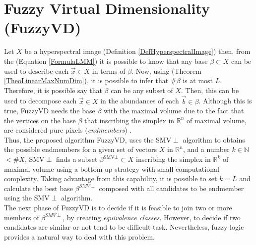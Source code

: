 \documentclass[11pt, oneside]{Thesis} %
\begin{document}
\section{Fuzzy Virtual Dimensionality (FuzzyVD)}

\label{subsectionFuzzyVDDescription}

Let $X$ be a hyperspectral image (Definition \ref{DefHyperspectralImage}) then, 
from the (Equation \ref{FormulaLMM}) it is possible to know that 
any base $\beta \subset X$ can be used to describe each $\vec{x} \in X$ in terms of 
$\beta$. Now, using (Theorem \ref{TheoLinearMaxNumDim}), it is possible to 
infer that $\# \beta$ is at most $L$. Therefore, it is possible say that 
$\beta$ can be any subset of $X$. Then, this can be used to decompose each $\vec{x} \in X$ 
in the abundances of each $\vec{b} \in \beta$. Although this is true, FuzzyVD needs the 
base $\beta$ with the maximal volume due to the fact that the vertices on the base $\beta$ 
that inscribing the simplex in $\mathbb{R}^{n}$ of maximal volume, are considered pure 
pixels (\emph{endmembers}) \cite{NFINDR}.\\

Thus, the proposed algorithm FuzzyVD, uses the SMV$\perp$ algorithm to obtains the possible endmembers for 
a given set of vectors $X$ in $\mathbb{R}^{n}$, and a number $k \in \mathbb{N}$ $ < \#X$, 
SMV$\perp$ finds a subset $\beta^{\text{SMV}\perp} \subset X$ inscribing the simplex in 
$\mathbb{R}^{k}$ of maximal volume using a bottom-up strategy with small computational 
complexity. Taking advantage from this capability, it is possible to set $k = L$ and 
calculate the best base $\beta^{SMV\perp}$ composed with all candidates to be endmember 
using the SMV$\perp$ algorithm.\\

The next phase of FuzzyVD is to decide if it is feasible to join two or more members of 
$\beta^{SMV\perp}$, by creating \emph{equivalence classes}. However, to decide if two 
candidates are similar or not tend to be difficult task. Nevertheless, fuzzy logic 
provides a natural way to deal with this problem. \\
\end{document}
